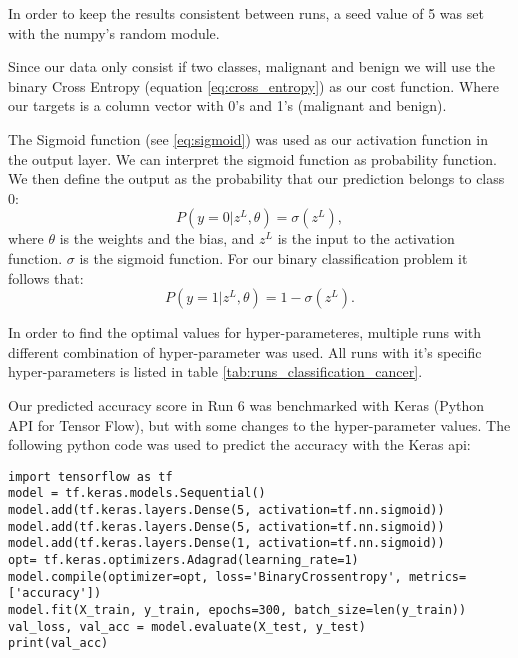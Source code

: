 In order to keep the results consistent between runs, a seed value of 5 was set
with the numpy's random module. 


Since our data only consist if two classes, malignant and benign we will use
the binary Cross Entropy (equation \ref{eq:cross_entropy}) as our cost function. Where our targets is a column vector
with 0's and 1's (malignant and benign). %


The Sigmoid function (see \eqref{eq:sigmoid}) was used as our activation
function in the output layer.
We can interpret the sigmoid function as probability function. 
We then define the output as the probability that our prediction belongs to
class 0: 
\begin{equation*}
    P(y = 0 | z^L, \theta ) = \sigma (z^L),
\end{equation*}
where $\theta $ is the weights and the bias, and $z^L$  is the input to the
activation function. $\sigma $ is the sigmoid function. 
For our binary classification problem it follows that: 
\begin{equation*}
    P(y = 1 | z^L, \theta ) = 1 - \sigma (z^L).
\end{equation*}



In order to find the optimal values for hyper-parameteres, multiple runs with
different combination of hyper-parameter was used. All runs with it's specific
hyper-parameters is listed in table \ref{tab:runs_classification_cancer}.

Our predicted accuracy score in Run 6 was benchmarked with Keras (Python API for Tensor
Flow), but with some changes to the hyper-parameter values. The following
python code was used to predict the accuracy with the Keras api:    
\begin{verbatim}
import tensorflow as tf
model = tf.keras.models.Sequential()
model.add(tf.keras.layers.Dense(5, activation=tf.nn.sigmoid))
model.add(tf.keras.layers.Dense(5, activation=tf.nn.sigmoid))
model.add(tf.keras.layers.Dense(1, activation=tf.nn.sigmoid))
opt= tf.keras.optimizers.Adagrad(learning_rate=1)
model.compile(optimizer=opt, loss='BinaryCrossentropy', metrics=['accuracy'])
model.fit(X_train, y_train, epochs=300, batch_size=len(y_train))
val_loss, val_acc = model.evaluate(X_test, y_test)
print(val_acc)
\end{verbatim}






